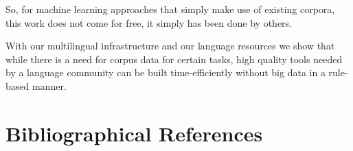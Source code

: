 \documentclass[free]{flammie}
\begin{document}
So, for machine learning approaches that simply make use of existing corpora,
this work does not come for free, it simply has been done by others.





With our multilingual infrastructure and our language resources we show that
while there is a need for corpus data for certain tasks, high quality tools
needed by a language community can be built time-efficiently without big data in
a rule-based manner.



















\section*{Bibliographical References}\label{reference}




\end{document}
